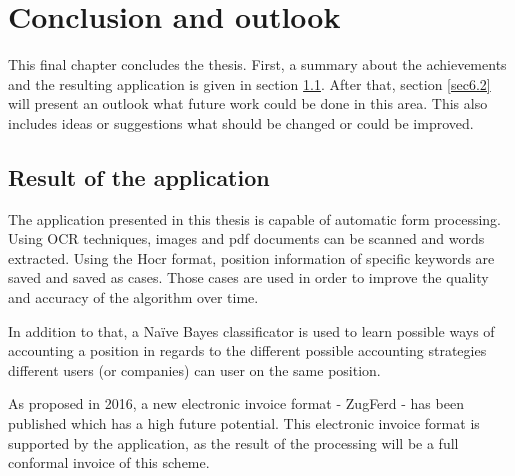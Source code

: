 %
% 
\chapter{Conclusion and outlook}
\label{cha6}

This final chapter concludes the thesis. First, a summary about the achievements and the resulting application is given in section \ref{sec6.1}. After that, section \ref{sec6.2} will present an outlook what future work could be done in this area. This also includes ideas or suggestions what should be changed or could be improved.

\section{Result of the application}
\label{sec6.1}

The application presented in this thesis is capable of automatic form processing. Using OCR techniques, images and pdf documents can be scanned and words extracted. Using the Hocr format, position information of specific keywords are saved and saved as cases. Those cases are used in order to improve the quality and accuracy of the algorithm over time. 

In addition to that, a Na{\"i}ve Bayes classificator is used to learn possible ways of accounting a position in regards to the different possible accounting strategies different users (or companies) can user on the same position.

As proposed in 2016, a new electronic invoice format - ZugFerd - has been published which has a high future potential. This electronic invoice format is supported by the application, as the result of the processing will be a full conformal invoice of this scheme.

